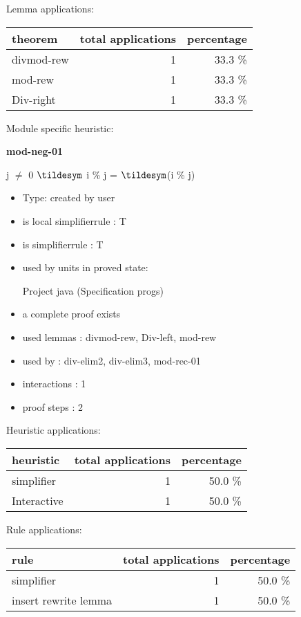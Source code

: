 \documentclass[a4paper]{article}
\begin{document}
Lemma applications:

\begin{supertabular}{l|r|r}
theorem	        & total applications & percentage \\ \hline
divmod-rew & 1 & 33.3 \% \\
mod-rew & 1 & 33.3 \% \\
Div-right & 1 & 33.3 \% \\

\end{supertabular}

Module specific heuristic:

\pagebreak

{\LARGE\bf mod-neg-01}\label{lemma-mod-neg-01}

\medskip

j $\neq$ 0 \Fol $\tildesym$ i \% j = $\tildesym$(i \% j)

\begin{itemize}

\item Type: created by user

\item is local simplifierrule : T
\item is simplifierrule : T
\item used by units in proved state:

Project java (Specification progs)
\item       a complete proof exists
\item       used lemmas  : divmod-rew, Div-left, mod-rew
\item       used by      : div-elim2, div-elim3, mod-rec-01
\item       interactions : 1
\item       proof steps  : 2
\end{itemize}

\medskip


Heuristic applications:

\begin{supertabular}{l|r|r}
heuristic	& total applications & percentage \\ \hline
simplifier & 1 & 50.0 \% \\
Interactive & 1 & 50.0 \% \\

\end{supertabular}

Rule applications:

\begin{supertabular}{l|r|r}
rule	        & total applications & percentage \\ \hline
simplifier & 1 & 50.0 \% \\
insert rewrite lemma & 1 & 50.0 \% \\

\end{supertabular}
\end{document}
